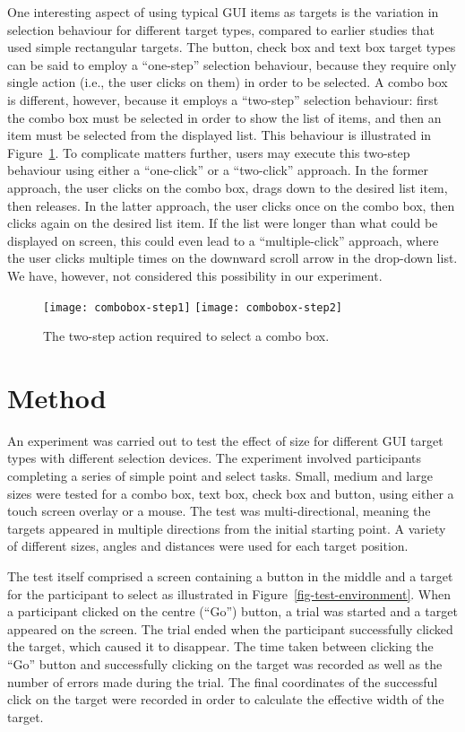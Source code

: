 \documentclass{elsart}
\begin{document}
One interesting aspect of using typical GUI items as targets is the
variation in selection behaviour for different target types, compared to
earlier studies that used simple rectangular targets. The button, check
box and text box target types can be said to employ a ``one-step''
selection behaviour, because they require only single action (i.e., the
user clicks on them) in order to be selected. A combo box is different,
however, because it employs a ``two-step'' selection behaviour: first
the combo box must be selected in order to show the list of items, and
then an item must be selected from the displayed list. This behaviour is
illustrated in Figure~\ref{fig-combo-box}. To complicate matters
further, users may execute this two-step behaviour using either a
``one-click'' or a ``two-click'' approach. In the former approach, the
user clicks on the combo box, drags down to the desired list item, then
releases. In the latter approach, the user clicks once on the combo box,
then clicks again on the desired list item. If the list were longer than
what could be displayed on screen, this could even lead to a
``multiple-click'' approach, where the user clicks multiple times on the
downward scroll arrow in the drop-down list. We have, however, not
considered this possibility in our experiment.


\begin{figure}
	\centering
	\texttt{[image: combobox-step1]}\quad
	\texttt{[image: combobox-step2]}
	\caption{The two-step action required to select a combo box.}
	\label{fig-combo-box}
\end{figure}



\section{Method}
\label{sec-method}

An experiment was carried out to test the effect of size for different
GUI target types with different selection devices. The experiment
involved participants completing a series of simple point and select
tasks. Small, medium and large sizes were tested for a combo box, text
box, check box and button, using either a touch screen overlay or a
mouse. The test was multi-directional, meaning the targets appeared in
multiple directions from the initial starting point. A variety of
different sizes, angles and distances were used for each target
position.

The test itself comprised a screen containing a button in the middle and
a target for the participant to select as illustrated in
Figure~\ref{fig-test-environment}. When a participant clicked on the
centre (``Go'') button, a trial was started and a target appeared on the
screen. The trial ended when the participant successfully clicked the
target, which caused it to disappear. The time taken between clicking
the ``Go'' button and successfully clicking on the target was recorded
as well as the number of errors made during the trial. The final
coordinates of the successful click on the target were recorded in order
to calculate the effective width of the target.
\end{document}
